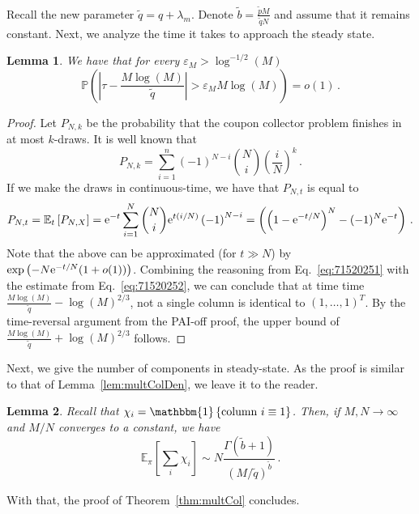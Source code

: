 \documentclass{article}
\numberwithin{equation}{section}
\newcommand{\gk}[1]{\left\{#1\right\}}
\newcommand{\ek}[1]{\left[#1\right]}
\newcommand{\rk}[1]{\left(#1\right)}
\newcommand{\abs}[1]{\left| #1 \right|}
\renewcommand{\P}   {\mathbb{P}}
\newcommand{\E}     {\mathbb{E}}
\newcommand{\ex}{{\rm e}}
\newcommand{\e}{\varepsilon}
\newcommand{\1}{\mathbbm{1}}
\renewcommand{\P}{\mathbb{P}}
\newtheorem{lemma}{Lemma}[section]
\begin{document}
Recall the new parameter $\widetilde{q}=q+\lambda_m$. Denote $\widetilde{b}=\tfrac{\widetilde{p}M}{\widetilde{q}N}$ and assume that it remains constant.
Next, we analyze the time it takes to approach the steady state.
\begin{lemma}
    We have that for every $\e_M>\log^{-1/2}(M)$
    \begin{equation}
        \P\rk{\abs{\tau-\frac{M\log(M)}{\widetilde{q}}}>\e_MM\log(M)}=o(1)\, .
    \end{equation}
\end{lemma}
\begin{proof}
    Let $P_{N,k}$ be the probability that the coupon collector problem finishes in at most $k$-draws. It is well known that
    \begin{equation}
        P_{N,k}=\sum_{i=1}^n(-1)^{N-i}\binom{N}{i}\rk{\frac{i}{N}}^k\, .
    \end{equation}
    If we make the draws in continuous-time, we have that $P_{N,t}$ is equal to
    \begin{equation}\label{eq:71520252}
        P_{N,t}=\E_t\ek{P_{N,X}}=\ex^{-t}\sum_{i=1}^N\binom{N}{i}\ex^{t(i/N)}\rk{-1}^{N-i}=\rk{\rk{1-\ex^{-t/N}}^N-(-1)^N\ex^{-t}}\, .
    \end{equation}
    Note that the above can be approximated (for $t\gg N$) by $\exp\rk{-N\ex^{-t/N}(1+o(1))}$. Combining the reasoning from Eq.~\eqref{eq:71520251} with the estimate from Eq.~\eqref{eq:71520252}, we can conclude that at time time $\frac{M\log(M)}{\widetilde{q}}-\log(M)^{2/3}$, not a single column is identical to $(1,\ldots,1)^T$. By the time-reversal argument from the PAI-off proof, the upper bound of $\frac{M\log(M)}{\widetilde{q}}+\log(M)^{2/3}$ follows.
\end{proof}

Next, we give the number of components in steady-state. As the proof is similar to that of Lemma~\ref{lem:multColDen}, we leave it to the reader.
\begin{lemma}
      Recall that $\chi_i=\1\gk{\textnormal{column }i\equiv 1}$. Then, if $M,N\to\infty$ and $M/N$ converges to a constant, we have
    \begin{equation}
        \E_\pi\ek{\sum_i \chi_i}\sim  N\frac{\Gamma\rk{\widetilde{b}+1}}{ (M/\widetilde{q})^{\widetilde{b}}}\, .
    \end{equation}
\end{lemma}
With that, the proof of Theorem~\ref{thm:multCol} concludes.



\end{document}
